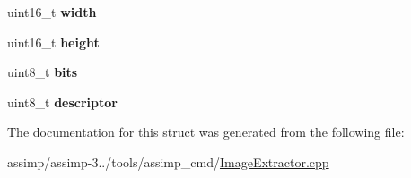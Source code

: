 \begin{DoxyCompactItemize}
\item 
\hypertarget{struct_t_g_a___h_e_a_d_e_r_ab288a3b19d074768516601bcb836742f}{uint16\+\_\+t {\bfseries width}}\label{struct_t_g_a___h_e_a_d_e_r_ab288a3b19d074768516601bcb836742f}

\item 
\hypertarget{struct_t_g_a___h_e_a_d_e_r_a9ddf60f8ae7d5070e6e8d2d35f4f82df}{uint16\+\_\+t {\bfseries height}}\label{struct_t_g_a___h_e_a_d_e_r_a9ddf60f8ae7d5070e6e8d2d35f4f82df}

\item 
\hypertarget{struct_t_g_a___h_e_a_d_e_r_ada2f2eeeed130078bc41ca59837102d1}{uint8\+\_\+t {\bfseries bits}}\label{struct_t_g_a___h_e_a_d_e_r_ada2f2eeeed130078bc41ca59837102d1}

\item 
\hypertarget{struct_t_g_a___h_e_a_d_e_r_aaaa41fadba20716756afe5a873a52e95}{uint8\+\_\+t {\bfseries descriptor}}\label{struct_t_g_a___h_e_a_d_e_r_aaaa41fadba20716756afe5a873a52e95}

\end{DoxyCompactItemize}


The documentation for this struct was generated from the following file\+:\begin{DoxyCompactItemize}
\item 
assimp/assimp-\/3../tools/assimp\+\_\+cmd/\hyperlink{_image_extractor_8cpp}{Image\+Extractor.\+cpp}\end{DoxyCompactItemize}
